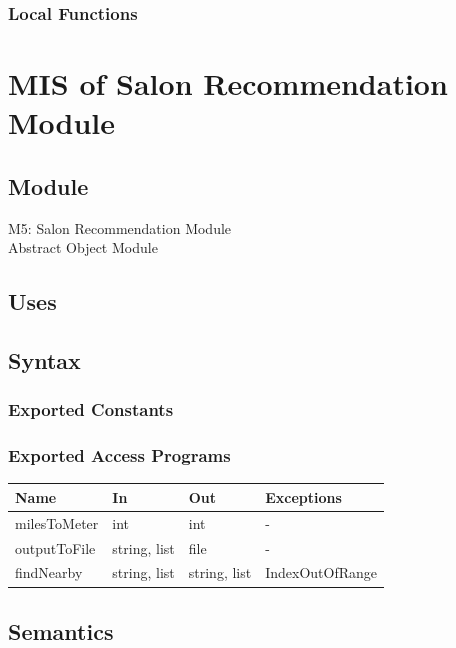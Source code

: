 \documentclass[12pt, titlepage]{article}
\begin{document}
\subsubsection{Local Functions}
 
\newpage
\section{MIS of Salon Recommendation Module} \label{Module} 

\subsection{Module}
M5: Salon Recommendation Module \\
Abstract Object Module


\subsection{Uses}


\subsection{Syntax}

\subsubsection{Exported Constants}

\subsubsection{Exported Access Programs}

\begin{center}
\begin{tabular}{p{4cm} p{3cm} p{4cm} p{4cm}}
\hline
\textbf{Name} & \textbf{In} & \textbf{Out} & \textbf{Exceptions} \\
\hline
milesToMeter  & int &  int  & - \\
outputToFile & string, list & file & - \\
findNearby & string, list & string, list & IndexOutOfRange \\
\hline
\end{tabular}
\end{center}

\subsection{Semantics}
\end{document}
